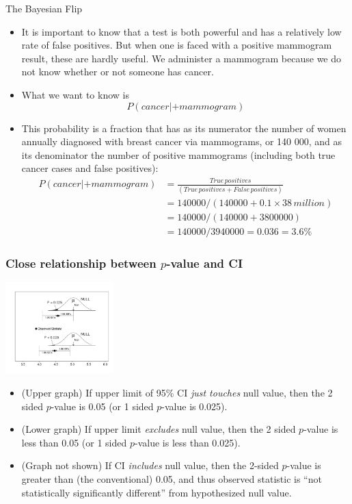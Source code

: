 \documentclass[10pt,handout]{beamer}\usepackage[]{graphicx}\usepackage[]{color}
\begin{document}
\begin{frame}{The Bayesian Flip}
	
	\begin{itemize}
		\item It is important to know that
		a test is both powerful and has a relatively low
		rate of false positives. But when one is faced
		with a positive mammogram result, these are
		hardly useful. We administer a mammogram
		because we do not know whether or not
		someone has cancer.
		\item What we want to know is
		$$P(cancer | +mammogram)$$ \pause 
		\item This probability is a fraction
		that has as its numerator the number of
		women annually diagnosed with breast
		cancer via mammograms, or 140 000, and
		as its denominator the number of positive
		mammograms (including both true cancer
		cases and false positives):
		\begin{align*}
			P(cancer | +mammogram) &= \frac{True\, positives}{(True\,positives + False\, positives)} \\
			&= 140 000 / (140 000 + 0.1 × 38\,million)
			\\
			&= 140 000 / (140 000 + 3 800 000)
			\\
			&= 140 000 / 3 940 000 = 0.036 = 3.6\%
		\end{align*}
	\end{itemize}
	
\end{frame}




\begin{frame}
	\frametitle{Close relationship between $p$-value and CI}
	\begin{center}
		\includegraphics[width=1.65in]{P-CI.pdf}
	\end{center} 
	\begin{footnotesize}
		\begin{itemize}
			\item
			(Upper graph) If upper limit of 95\% CI\textit{ just touches} null value, then
			the 2 sided $p$-value is 0.05 (or 1 sided $p$-value is 0.025). 
			\item
			(Lower graph) If upper limit \textit{excludes} null value, then
			the 2 sided $p$-value is less than 0.05 (or 1 sided $p$-value is less than 0.025). 
			\item
			(Graph not shown) If  CI \textit{includes} null value, then the 2-sided $p$-value is greater than (the conventional) 0.05, and thus observed statistic is ``not statistically significantly different'' from hypothesized null value. 
		\end{itemize}
	\end{footnotesize}
\end{frame}
\end{document}
